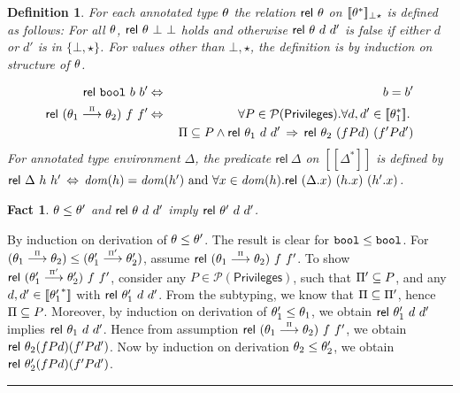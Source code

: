 \documentclass[submission,copyright,creativecommons]{eptcs}
\newcommand{\blackslug}{\rule{7pt}{7pt}}
\newcommand{\BOOL}{\mbox{\texttt{bool}}}
\renewcommand{\P}{\mathcal{P}}
\newcommand{\dom}{{\it dom}}
\newcommand{\ldb}{[\![}
\newcommand{\rdb}{]\!]}
\newcommand{\means}[1]{\ldb {#1}\rdb}
\def\lpields#1{\stackrel{#1}{\longrightarrow}}
\newcommand{\annoto}[1]{\lpields {\scriptscriptstyle #1}}
\newcommand{\PRIV}{{\mathsf{Privileges}}}
\newcommand{\Rel}{\textsf{rel}}
\renewcommand{\implies}{\mathbin{\:\Rightarrow\:}}
\renewcommand{\iff}{\mathbin{\:\Leftrightarrow\:}}
\newtheorem{factx}[theorem]{Fact}
\newtheorem{definition}[theorem]{Definition}
\newenvironment{proof}{\begin{trivlist}\item[\hskip\labelsep{\bf
Proof:}]}{\blackslug\end{trivlist}}
\begin{document}
\begin{definition}
For each annotated type $\theta$ the relation $\Rel~\th$ on 
$\means{\th^*}_{\bot\star}$ is defined as follows:
For all $\theta$, $\Rel~ {\th}~\bot~\bot$ holds and otherwise
$\Rel~\th~d~d'$ is false if either $d$ or $d'$ is in $\{\bot,\star\}$.
For values other than $\bot, \star$,
the definition is by induction on structure of $\theta$.

\begin{eqnarray*}
\Rel~ {\BOOL}~b~b' &\iff & b=b' \\
\Rel~(\th_1\annoto\Ps\th_2)~f~f' &\iff &
\forall P\in\P(\PRIV) .\forall d,d'\in\means{\th_1^*}.\; \\
&&  \Ps\subseteq P \land 
\Rel~{\th_1}~d~d'\implies \Rel~ {\th_2}~(f P d)~(f' P d')
\end{eqnarray*}
For annotated type environment $\Delta$, the predicate  
$\Rel~\Delta$ on $\means{\Delta^*}$ is defined by
$\Rel~\Delta~\h~\h' \iff \dom(\h)=\dom(\h')\mbox{  and } 
\forall x\in\dom(\h) . \Rel~(\Delta.x)~(\h.x)~(\h'.x)$.
\end{definition}

\begin{factx}\label{fact:relMono}
  $\theta\leq \theta'$ and $\Rel~\th~d~d'$ imply $\Rel~\th'~d~d'$.
\end{factx}
\begin{proof}
By induction on derivation of $\theta\leq\theta'$.  The result is clear for
$\BOOL\leq\BOOL$. For $(\th_1\annoto{\Ps}\th_2)\leq(\th'_1\annoto{\Ps'}\th'_2)$,
assume $\Rel~(\th_1\annoto{\Ps}\th_2)~f~f'$. 
To show $\Rel~(\th'_1\annoto{\Ps'}\th'_2)~f~f'$, consider 
any $P\in\P(\PRIV)$, such that $\Pi'\subseteq P$, and any 
$d, d'\in\means{{\th'_1}^*}$ with $\Rel~\th'_1~d~d'$. From the subtyping, 
we know
that $\Pi\subseteq\Pi'$, hence $\Pi\subseteq P$. Moreover, by induction
on derivation of $\theta'_1\leq\theta_1$, we obtain $\Rel~\th'_1~d~d'$ implies
$\Rel~\th_1~d~d'$. Hence from assumption $\Rel~(\th_1\annoto{\Ps}\th_2)~f~f'$, 
we obtain $\Rel~\th_2(f P d)(f' P d')$. Now by induction on derivation 
$\theta_2\leq\theta'_2$, we obtain $\Rel~\th'_2(f P d)(f' P d')$.  
\end{proof}
\end{document}
